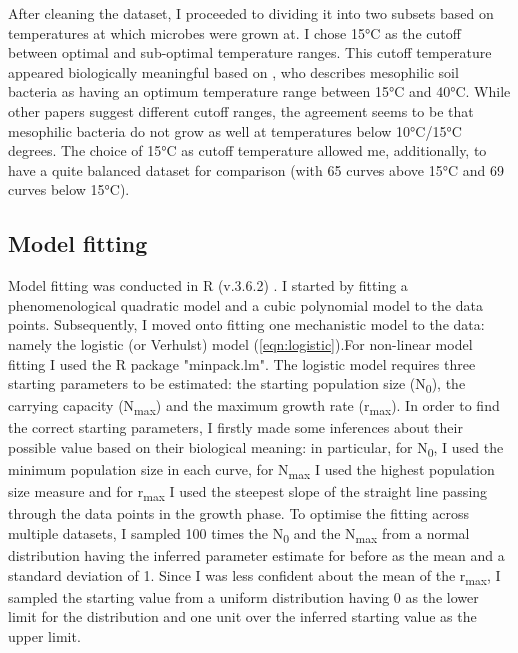 \documentclass[a4paper]{article}
\begin{document}
    After cleaning the dataset, I proceeded to dividing it into two subsets based on temperatures at which microbes were grown at. I chose 15°C as the cutoff between optimal and sub-optimal temperature ranges. This cutoff temperature appeared biologically meaningful based on \cite{HARTEL2005448}, who describes mesophilic soil bacteria as having an optimum temperature range between 15°C and 40°C. While other papers suggest different cutoff ranges, the agreement seems to be that mesophilic bacteria do not grow as well at temperatures below 10°C/15°C degrees. The choice of 15°C as cutoff temperature allowed me, additionally, to have a quite balanced dataset for comparison (with 65 curves above 15°C and 69 curves below 15°C).
    
    \subsection{Model fitting}
    Model fitting was conducted in R (v.3.6.2) \citep{Rcit}. I started by fitting a phenomenological quadratic model and a cubic polynomial model to the data points. 
    Subsequently, I moved onto fitting one mechanistic model to the data: namely the logistic (or Verhulst) model (\ref{eqn:logistic}).\newline For non-linear model fitting I used the R package "minpack.lm". The logistic model requires three starting parameters to be estimated: the starting population size (N\textsubscript{0}), the carrying capacity (N\textsubscript{max}) and the maximum growth rate (r\textsubscript{max}). In order to find the correct starting parameters, I firstly made some inferences about their possible value based on their biological meaning: in particular, for N\textsubscript{0}, I used the minimum population size in each curve, for N\textsubscript{max} I used the highest population size measure and for r\textsubscript{max} I used the steepest slope of the straight line passing through the data points in the growth phase. To optimise the fitting across multiple datasets, I sampled 100 times the N\textsubscript{0} and the N\textsubscript{max} from a normal distribution having the inferred parameter estimate for before as the mean and a standard deviation of 1. Since I was less confident about the mean of the r\textsubscript{max}, I sampled the starting value from a uniform distribution having 0 as the lower limit for the distribution and one unit over the inferred starting value as the upper limit. 
    
\end{document}
